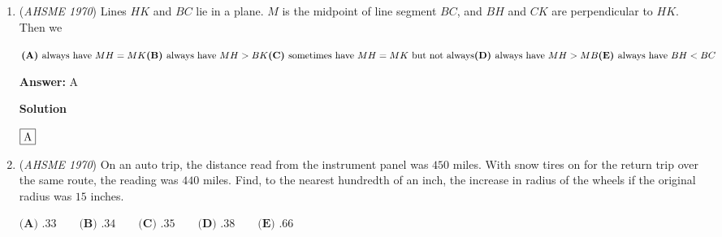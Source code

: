 \begin{enumerate}
 
 \begin{align*} 15 &= \frac{a}{1-r} \\ 45 &= \frac{a^{2}}{1-r^{2}} \end{align*}


 We get

 
 \begin{align*} a &= 15 - 15r \\ a^{2} &= 45 - 45r^{2} \\ \\ (15 - 15r)^{2} &= 45 - 45r^{2} \\ 270r^{2} - 450r + 180 &= 0 \\ 3r^{2} - 5r + 2 &= 0 \\ (3r - 2)(r - 1) &= 0 \end{align*}


 Since $|r| < 1$, $r = \frac{2}{3}$, so plug this into the equation above and we get $a = 15 - 15r = 15 - 10 = \boxed{\textbf{(C)} \quad 5}$

 Solution by $\underline{\textbf{Invoker}}$



	\item (\textit{AHSME 1970}) Lines $HK$ and $BC$ lie in a plane. $M$ is the midpoint of line segment $BC$, and $BH$ and $CK$ are perpendicular to $HK$. Then we 


 $\textbf{(A) }\text{always have }MH=MK\qquad\\ \textbf{(B) }\text{always have }MH>BK\qquad\\ \textbf{(C) }\text{sometimes have }MH=MK\text{ but not always}\qquad\\ \textbf{(D) }\text{always have }MH>MB\qquad \\ \textbf{(E) }\text{always have }BH<BC$

 \textbf{Answer: }A



\textbf{Solution}

$\fbox{A}$



	\item (\textit{AHSME 1970}) On an auto trip, the distance read from the instrument panel was $450$ miles. 
With snow tires on for the return trip over the same route, the reading was $440$ miles. 
Find, to the nearest hundredth of an inch, the increase in radius of the wheels if the original radius was $15$ inches.


 $\textbf{(A) }.33\qquad \textbf{(B) }.34\qquad \textbf{(C) }.35\qquad \textbf{(D) }.38\qquad  \textbf{(E) }.66$


\end{enumerate}
